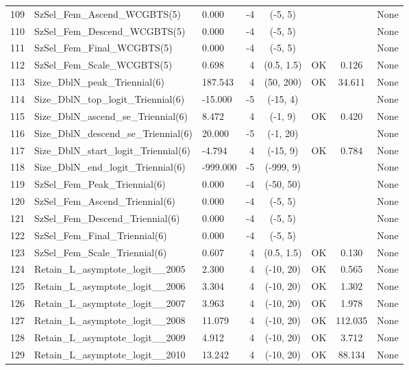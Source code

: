 \documentclass[12pt,]{article}
\begin{document}
\begin{landscape}
\begin{longtable}{lp{2.5in}lrcccl}
  109 & SzSel\_Fem\_Ascend\_WCGBTS(5) & 0.000 & -4 & (-5, 5) &  &  & None \\ 
  110 & SzSel\_Fem\_Descend\_WCGBTS(5) & 0.000 & -4 & (-5, 5) &  &  & None \\ 
  111 & SzSel\_Fem\_Final\_WCGBTS(5) & 0.000 & -4 & (-5, 5) &  &  & None \\ 
  112 & SzSel\_Fem\_Scale\_WCGBTS(5) & 0.698 & 4 & (0.5, 1.5) & OK & 0.126 & None \\ 
  113 & Size\_DblN\_peak\_Triennial(6) & 187.543 & 4 & (50, 200) & OK & 34.611 & None \\ 
  114 & Size\_DblN\_top\_logit\_Triennial(6) & -15.000 & -5 & (-15, 4) &  &  & None \\ 
  115 & Size\_DblN\_ascend\_se\_Triennial(6) & 8.472 & 4 & (-1, 9) & OK & 0.420 & None \\ 
  116 & Size\_DblN\_descend\_se\_Triennial(6) & 20.000 & -5 & (-1, 20) &  &  & None \\ 
  117 & Size\_DblN\_start\_logit\_Triennial(6) & -4.794 & 4 & (-15, 9) & OK & 0.784 & None \\ 
  118 & Size\_DblN\_end\_logit\_Triennial(6) & -999.000 & -5 & (-999, 9) &  &  & None \\ 
  119 & SzSel\_Fem\_Peak\_Triennial(6) & 0.000 & -4 & (-50, 50) &  &  & None \\ 
  120 & SzSel\_Fem\_Ascend\_Triennial(6) & 0.000 & -4 & (-5, 5) &  &  & None \\ 
  121 & SzSel\_Fem\_Descend\_Triennial(6) & 0.000 & -4 & (-5, 5) &  &  & None \\ 
  122 & SzSel\_Fem\_Final\_Triennial(6) & 0.000 & -4 & (-5, 5) &  &  & None \\ 
  123 & SzSel\_Fem\_Scale\_Triennial(6) & 0.607 & 4 & (0.5, 1.5) & OK & 0.130 & None \\ 
  124 & Retain\_L\_asymptote\_logit\_\_2005 & 2.300 & 4 & (-10, 20) & OK & 0.565 & None \\ 
  125 & Retain\_L\_asymptote\_logit\_\_2006 & 3.304 & 4 & (-10, 20) & OK & 1.302 & None \\ 
  126 & Retain\_L\_asymptote\_logit\_\_2007 & 3.963 & 4 & (-10, 20) & OK & 1.978 & None \\ 
  127 & Retain\_L\_asymptote\_logit\_\_2008 & 11.079 & 4 & (-10, 20) & OK & 112.035 & None \\ 
  128 & Retain\_L\_asymptote\_logit\_\_2009 & 4.912 & 4 & (-10, 20) & OK & 3.712 & None \\ 
  129 & Retain\_L\_asymptote\_logit\_\_2010 & 13.242 & 4 & (-10, 20) & OK & 88.134 & None \\ 

\end{longtable}
\end{landscape}
\end{document}
